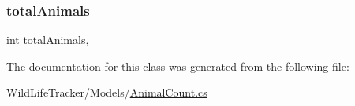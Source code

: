 \subsubsection{\texorpdfstring{total\+Animals}{totalAnimals}}
{\footnotesize\ttfamily int total\+Animals\hspace{0.3cm}{\ttfamily [get]}, {\ttfamily [set]}}



The documentation for this class was generated from the following file\+:\begin{DoxyCompactItemize}
\item 
Wild\+Life\+Tracker/\+Models/\hyperlink{AnimalCount_8cs}{Animal\+Count.\+cs}\end{DoxyCompactItemize}
